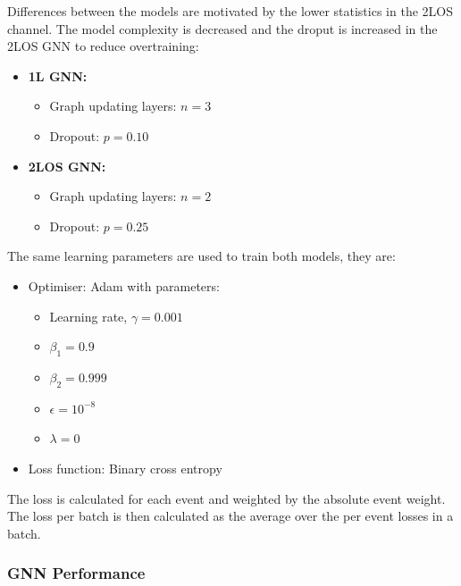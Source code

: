 Differences between the models are motivated by the lower statistics in the 2LOS channel. The model complexity is decreased and the droput is increased in the 2LOS GNN to reduce overtraining:
\begin{itemize}
    \item \textbf{1L GNN:}
    \begin{itemize}
    \item Graph updating layers: $n=3$
    \item Dropout: $p=0.10$
    \end{itemize}
    \item \textbf{2LOS GNN:}
    \begin{itemize}
    \item Graph updating layers: $n=2$
    \item Dropout: $p=0.25$
    \end{itemize}
\end{itemize}

The same learning parameters are used to train both models, they are:

\begin{itemize}
    \item Optimiser: Adam with parameters: 
    \begin{itemize}
        \item Learning rate, $\gamma=0.001$
        \item $\beta_1=0.9$
        \item $\beta_2=0.999$
        \item $\epsilon=10^{-8}$
        \item $\lambda=0$
    \end{itemize}
    \item Loss function: Binary cross entropy
\end{itemize}
The loss is calculated for each event and weighted by the absolute event weight. The loss per batch is then calculated as the average over the per event losses in a batch.

\subsubsection{GNN Performance}


